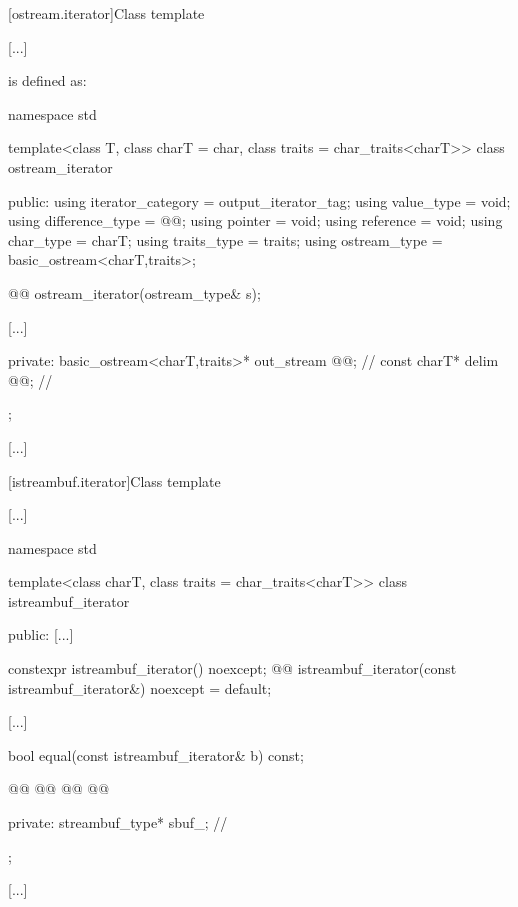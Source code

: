 [ostream.iterator]{Class template }

[...]

\setcounter{Paras}{1}
\pnum {} is defined as:

\begin{codeblock}
namespace std {
  template<class T, class charT = char, class traits = char_traits<charT>>
  class ostream_iterator {
  public:
    using iterator_category = output_iterator_tag;
    using value_type        = void;
    using difference_type   = @@;
    using pointer           = void;
    using reference         = void;
    using char_type         = charT;
    using traits_type       = traits;
    using ostream_type      = basic_ostream<charT,traits>;

    @@
    ostream_iterator(ostream_type& s);

    [...]

  private:
    basic_ostream<charT,traits>* out_stream @@;  // \expos
    const charT* delim @@;                       // \expos
  };
}
\end{codeblock}

[...]

[istreambuf.iterator]{Class template }

[...]

%
\begin{codeblock}
namespace std {
  template<class charT, class traits = char_traits<charT>>
  class istreambuf_iterator {
  public:
    [...]

    constexpr istreambuf_iterator() noexcept;
    @@
    istreambuf_iterator(const istreambuf_iterator&) noexcept = default;

    [...]

    bool equal(const istreambuf_iterator& b) const;

    @@
    @@
    @@
    @@

  private:
    streambuf_type* sbuf_;                // \expos
  };

  [...]
}
\end{codeblock}

